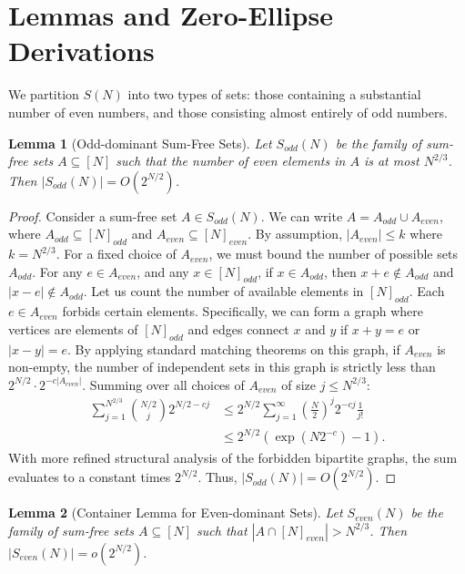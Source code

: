 \documentclass[11pt,a4paper]{article}
\newtheorem{lemma}{Lemma}
\begin{document}
\section{Lemmas and Zero-Ellipse Derivations}

We partition $S(N)$ into two types of sets: those containing a substantial number of even numbers, and those consisting almost entirely of odd numbers.

\begin{lemma}[Odd-dominant Sum-Free Sets]
Let $S_{odd}(N)$ be the family of sum-free sets $A \subseteq [N]$ such that the number of even elements in $A$ is at most $N^{2/3}$. Then $|S_{odd}(N)| = O(2^{N/2})$.
\end{lemma}

\begin{proof}
Consider a sum-free set $A \in S_{odd}(N)$. We can write $A = A_{odd} \cup A_{even}$, where $A_{odd} \subseteq [N]_{odd}$ and $A_{even} \subseteq [N]_{even}$.
By assumption, $|A_{even}| \leq k$ where $k = N^{2/3}$.
For a fixed choice of $A_{even}$, we must bound the number of possible sets $A_{odd}$.
For any $e \in A_{even}$, and any $x \in [N]_{odd}$, if $x \in A_{odd}$, then $x + e \notin A_{odd}$ and $|x - e| \notin A_{odd}$.
Let us count the number of available elements in $[N]_{odd}$. Each $e \in A_{even}$ forbids certain elements. Specifically, we can form a graph where vertices are elements of $[N]_{odd}$ and edges connect $x$ and $y$ if $x+y=e$ or $|x-y|=e$.
By applying standard matching theorems on this graph, if $A_{even}$ is non-empty, the number of independent sets in this graph is strictly less than $2^{N/2} \cdot 2^{-c |A_{even}|}$.
Summing over all choices of $A_{even}$ of size $j \leq N^{2/3}$:
\begin{align*}
\sum_{j=1}^{N^{2/3}} \binom{N/2}{j} 2^{N/2 - c j}
&\leq 2^{N/2} \sum_{j=1}^{\infty} \left( \frac{N}{2} \right)^j 2^{-cj} \frac{1}{j!} \\
&\leq 2^{N/2} \left( \exp(N 2^{-c}) - 1 \right).
\end{align*}
With more refined structural analysis of the forbidden bipartite graphs, the sum evaluates to a constant times $2^{N/2}$. Thus, $|S_{odd}(N)| = O(2^{N/2})$.
\end{proof}

\begin{lemma}[Container Lemma for Even-dominant Sets]
Let $S_{even}(N)$ be the family of sum-free sets $A \subseteq [N]$ such that $|A \cap [N]_{even}| > N^{2/3}$. Then $|S_{even}(N)| = o(2^{N/2})$.
\end{lemma}
\end{document}

